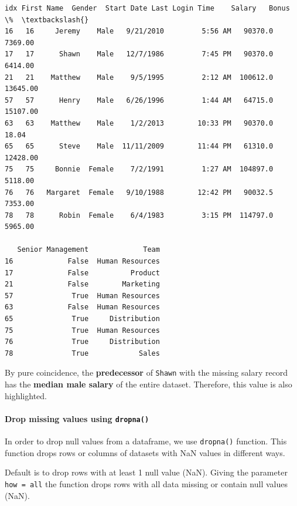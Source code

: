 \documentclass [oneside,10pt,a4paper,ngerman,BCOR10mm,headsepline,parindent,final]{scrartcl}
\makeatletter
\newcommand{\boxspacing}{\kern\kvtcb@left@rule\kern\kvtcb@boxsep}
\newcommand{\prompt}[4]{
        {\ttfamily\llap{{\color{#2}[#3]:\hspace{3pt}#4}}\vspace{-\baselineskip}}
    }
\makeatother
\begin{document}
            \begin{tcolorbox}[breakable, size=fbox, boxrule=.5pt, pad at break*=1mm, opacityfill=0]
\prompt{Out}{outcolor}{17}{\boxspacing}
\begin{Verbatim}[commandchars=\\\{\}]
    idx First Name  Gender  Start Date Last Login Time    Salary   Bonus \%  \textbackslash{}
16   16     Jeremy    Male   9/21/2010         5:56 AM   90370.0   7369.00
17   17      Shawn    Male   12/7/1986         7:45 PM   90370.0   6414.00
21   21    Matthew    Male    9/5/1995         2:12 AM  100612.0  13645.00
57   57      Henry    Male   6/26/1996         1:44 AM   64715.0  15107.00
63   63    Matthew    Male    1/2/2013        10:33 PM   90370.0     18.04
65   65      Steve    Male  11/11/2009        11:44 PM   61310.0  12428.00
75   75     Bonnie  Female    7/2/1991         1:27 AM  104897.0   5118.00
76   76   Margaret  Female   9/10/1988        12:42 PM   90032.5   7353.00
78   78      Robin  Female    6/4/1983         3:15 PM  114797.0   5965.00

   Senior Management             Team
16             False  Human Resources
17             False          Product
21             False        Marketing
57              True  Human Resources
63             False  Human Resources
65              True     Distribution
75              True  Human Resources
76              True     Distribution
78              True            Sales
\end{Verbatim}
\end{tcolorbox}
        
    By pure coincidence, the \textbf{predecessor} of \texttt{Shawn} with the
missing salary record has the \textbf{median male salary} of the entire
dataset. Therefore, this value is also highlighted.

    \hypertarget{drop-missing-values-using-dropna}{%
\paragraph{\texorpdfstring{Drop missing values using
\texttt{dropna()}}{Drop missing values using dropna()}}\label{drop-missing-values-using-dropna}}

In order to drop null values from a dataframe, we use \texttt{dropna()}
function. This function drops rows or columns of datasets with NaN
values in different ways.

Default is to drop rows with at least 1 null value (NaN). Giving the
parameter \texttt{how\ =\ \textquotesingle{}all\textquotesingle{}} the
function drops rows with all data missing or contain null values (NaN).
\end{document}
